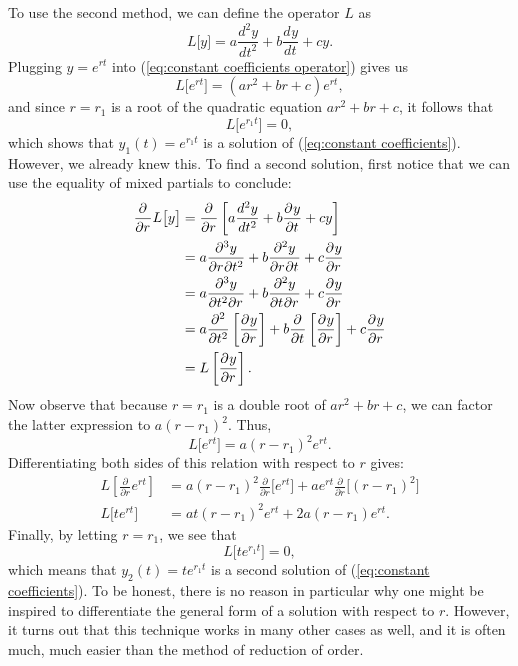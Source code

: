\documentclass{myart}
\newcommand{\eq}[1]{(\ref{eq:#1})}
\newcommand{\deriv}[3][]{\frac{d^{#1}#2}{d#3^{#1}}}
\newcommand{\pderiv}[3][]{\frac{\partial^{#1}#2}{\partial#3^{#1}}}
\newcommand{\ppderiv}[5]{\frac{\partial^{\the\numexpr \ifstrempty{#3}{1}{#3} + \ifstrempty{#5}{1}{#5} \relax}#1}{\partial#4^{#5} \partial#2^{#3}}}
\begin{document}
To use the second method, we can define the operator $L$ as
\begin{equation} \label{eq:constant coefficients operator}
L\big[y\big] = a \deriv[2]{y}{t} + b \deriv{y}{t} + cy.
\end{equation}
Plugging $y = e^{rt}$ into \eq{constant coefficients operator} gives us
\begin{equation*}
L\big[e^{rt}\big] = (ar^2 + br + c)e^{rt},
\end{equation*}
and since $r = r_1$ is a root of the quadratic equation $ar^2 + br + c$, it follows that
\begin{equation*}
L\big[e^{r_1t}\big] = 0,
\end{equation*}
which shows that $y_1(t) = e^{r_1t}$ is a solution of \eq{constant coefficients}. However, we already knew this. To find a second solution, first notice that we can use the equality of mixed partials to conclude:
\begin{align*}
\pderiv{}{r} L\big[y\big] &= \pderiv{}{r} \left[a \deriv[2]{y}{t} + b \pderiv{y}{t} + cy\right] \\
&= a \ppderiv{y}{t}{2}{r}{} + b \ppderiv{y}{t}{}{r}{} + c \pderiv{y}{r} \\
&= a \ppderiv{y}{r}{}{t}{2} + b \ppderiv{y}{r}{}{t}{} + c \pderiv{y}{r} \\
&= a \pderiv[2]{}{t} \left[\pderiv{y}{r}\right] + b \pderiv{}{t} \left[\pderiv{y}{r}\right] + c \pderiv{y}{r} \\
&= L\left[\pderiv{y}{r}\right].
\end{align*}
Now observe that because $r = r_1$ is a double root of $ar^2 + br + c$, we can factor the latter expression to $a(r - r_1)^2$. Thus,
\begin{equation*}
L\big[e^{rt}\big] = a(r - r_1)^2e^{rt}.
\end{equation*}
Differentiating both sides of this relation with respect to $r$ gives:
\begin{align*}
L\left[\pderiv{}{r} e^{rt}\right] &= a(r - r_1)^2 \pderiv{}{r} \Big[e^{rt}\Big] + ae^{rt} \pderiv{}{r} \Big[(r - r_1)^2\Big] \\
L\big[te^{rt}\big] &= at(r - r_1)^2e^{rt} + 2a(r - r_1)e^{rt}.
\end{align*}
Finally, by letting $r = r_1$, we see that
\begin{equation*}
L\big[te^{r_1t}\big] = 0,
\end{equation*}
which means that $y_2(t) = te^{r_1t}$ is a second solution of \eq{constant coefficients}. To be honest, there is no reason in particular why one might be inspired to differentiate the general form of a solution with respect to $r$. However, it turns out that this technique works in many other cases as well, and it is often much, much easier than the method of reduction of order.
\end{document}
